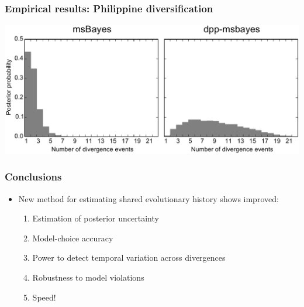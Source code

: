 \begin{frame}
    \frametitle{Empirical results: Philippine diversification}
    \centerline{
    \includegraphics[width=\textwidth]{../../empirical-analyses/plots/philippines-dpp-psi-posterior-old-vs-dpp.pdf}}
\end{frame}

\begin{frame}
    \frametitle{Conclusions}
    \begin{itemize}
        \item<1-> New method for estimating shared evolutionary history shows
            improved:
        \begin{enumerate}
            \item Estimation of posterior uncertainty
            \item Model-choice accuracy
            \item Power to detect temporal variation across divergences
            \item Robustness to model violations
            \item Speed!
        \end{enumerate}

    \end{itemize}

\end{frame}

